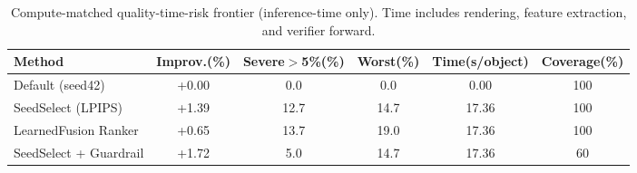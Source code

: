\begin{table}[t]
  \centering
  \caption{Compute-matched quality-time-risk frontier (inference-time only). Time includes rendering, feature extraction, and verifier forward.}
  \label{tab:frontier_qtr}
  \begin{tabular}{lccccc}
    \toprule
    Method & Improv.(\%) & Severe$>$5\%(\%) & Worst(\%) & Time(s/object) & Coverage(\%) \\
    \midrule
    Default (seed42)         & +0.00 & 0.0  & 0.0  & 0.00  & 100 \\
    SeedSelect (LPIPS)       & +1.39 & 12.7 & 14.7 & 17.36 & 100 \\
    LearnedFusion Ranker     & +0.65 & 13.7 & 19.0 & 17.36 & 100 \\
    SeedSelect + Guardrail   & +1.72 & 5.0  & 14.7 & 17.36 & 60 \\
    \bottomrule
  \end{tabular}
\end{table}

